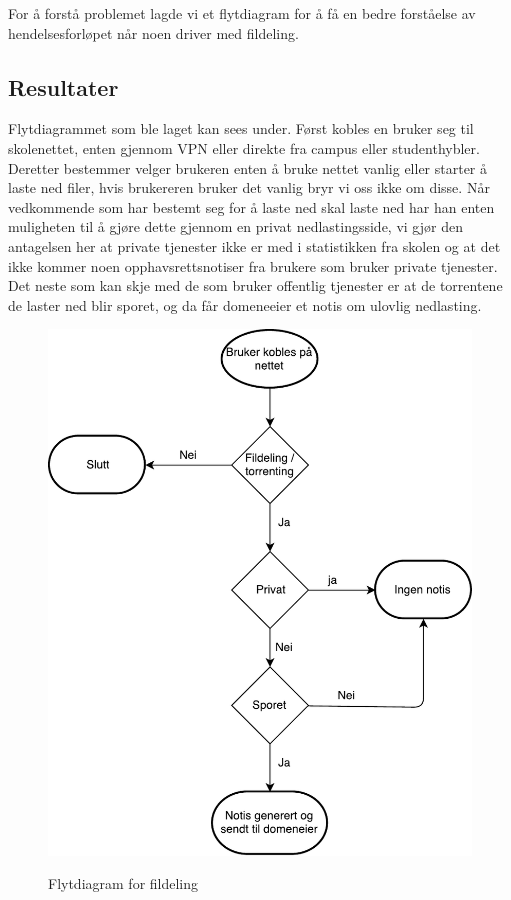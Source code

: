 For å forstå problemet lagde vi et flytdiagram for å få en bedre forståelse av hendelsesforløpet når noen driver med fildeling.

\subsection{Resultater}
Flytdiagrammet som ble laget kan sees under. Først kobles en bruker seg til skolenettet, enten gjennom VPN eller direkte fra campus eller studenthybler. Deretter bestemmer velger brukeren enten å bruke nettet vanlig eller starter å laste ned filer, hvis brukereren bruker det vanlig bryr vi oss ikke om disse. Når vedkommende som har bestemt seg for å laste ned skal laste ned har han enten muligheten til å gjøre dette gjennom en privat nedlastingsside, vi gjør den antagelsen her at private tjenester ikke er med i statistikken fra skolen og at det ikke kommer noen opphavsrettsnotiser fra brukere som bruker private tjenester. Det neste som kan skje med de som bruker offentlig tjenester er at de torrentene de laster ned blir sporet, og da får domeneeier et notis om ulovlig nedlasting.
\begin{figure}[H]
    \centering
    \includegraphics[scale=0.5]{case_1/bilder/Flowchart.pdf}
    \label{fig:Flytdiagram}
    \caption[Flytdiagram for fildeling]{Flytdiagram for fildeling}
\end{figure}

